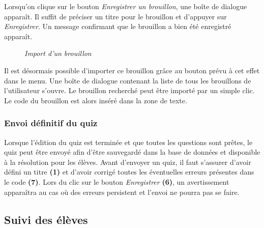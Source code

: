 \documentclass[a4paper,11pt,openany,oneside]{sphinxmanual}
\begin{document}
Lorsqu'on clique sur le bouton \emph{Enregistrer un brouillon}, une boîte de dialogue apparaît. Il suffit de préciser un titre pour le brouillon et d'appuyer sur \emph{Enregistrer}. Un message confirmant que le brouillon a bien été enregistré apparaît.
\begin{figure}[htbp]
\centering
\capstart

\caption{\emph{Import d'un brouillon}}\end{figure}

Il est désormais possible d'importer ce brouillon grâce au bouton prévu à cet effet dans le menu. Une boîte de dialogue contenant la liste de tous les brouillons de l'utilisateur s'ouvre. Le brouillon recherché peut être importé par un simple clic. Le code du brouillon est alors inséré dans la zone de texte.


\subsubsection{Envoi définitif du quiz}
\label{doc-user:envoi-definitif-du-quiz}
Lorsque l'édition du quiz est terminée et que toutes les questions sont prêtes, le quiz peut être envoyé afin d'être sauvegardé dans la base de données et disponible à la résolution pour les élèves. Avant d'envoyer un quiz, il faut s'assurer d'avoir défini un titre \textbf{(1)} et d'avoir corrigé toutes les éventuelles erreurs présentes dans le code \textbf{(7)}. Lors du clic sur le bouton \emph{Enregistrer} \textbf{(6)}, un avertissement apparaîtra au cas où des erreurs persistent et l'envoi ne pourra pas se faire.


\subsection{Suivi des élèves}
\label{doc-user:suivi-des-eleves}
\end{document}
